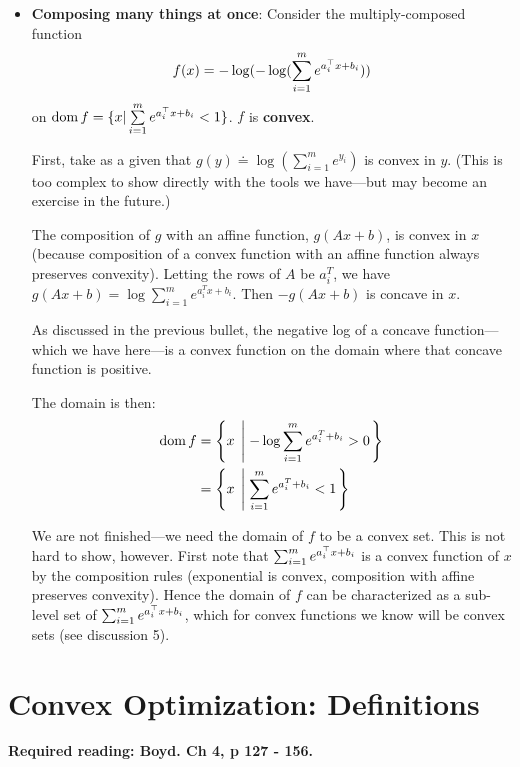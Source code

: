 \documentclass[12pt]{article}
\begin{document}
\begin{itemize}
\item \textbf{Composing many things at once}: Consider the multiply-composed function
\begin{equation*}
f(x) = -\log (-\log (\sum\limits_{i=1}^m e^{a_i^{\top} x + b_i}))
\end{equation*}
%
on $\mathop {\mathrm {dom}} f = \{ x | \sum\limits_{i=1}^m e^{a_i^{\top} x + b_i} < 1\}$. $f$ is \textbf{convex}.

First, take as a given that  $g(y) \doteq \log (\sum_{i=1}^m e^{y_i})$ is convex in $y$. (This is too complex to show directly with the tools we have---but may become an exercise in the future.)

The composition of $g$ with an affine function, $g(Ax+b)$, is convex in $x$ (because composition of a convex function with an affine function always preserves convexity). Letting the rows of $A$ be $a_i^T$, we have $g(Ax + b) = \log \sum_{i=1}^m e^{a_i^T x + b_i}$. Then $-g(Ax+b)$ is concave in $x$.

As discussed in the previous bullet, the negative log of a concave function---which we have here---is a convex function on the domain where that concave function is positive. 

The domain is then:
%
\begin{align*}
\mathop {\mathrm {dom}} f &= \left\{x \; \left| \; -\log \sum_{i=1}^m e^{a_i^T + b_i} > 0\right.\right\} \\
&= \left\{x \; \left| \; \sum_{i=1}^m e^{a_i^T + b_i} < 1\right.\right\}
\end{align*}

We are not finished---we need the domain of $f$ to be a convex set. This is not hard to show, however. First note that $\sum_{i=1}^m e^{a_i^{\top} x + b_i}$ is a convex function of $x$ by the composition rules (exponential is convex, composition with affine preserves convexity). Hence the domain of $f$ can be characterized as a sub-level set of $\sum_{i=1}^m e^{a_i^{\top} x + b_i}$, which for convex functions we know will be convex sets (see discussion 5).

\end{itemize}



\pagebreak

\section{Convex Optimization: Definitions}

\textbf{Required reading: Boyd. Ch 4, p 127 - 156.}
\end{document}
